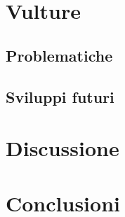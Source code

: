 \chapter{Vulture}

\section{Problematiche}

\section{Sviluppi futuri}

\chapter{Discussione}

\chapter{Conclusioni}